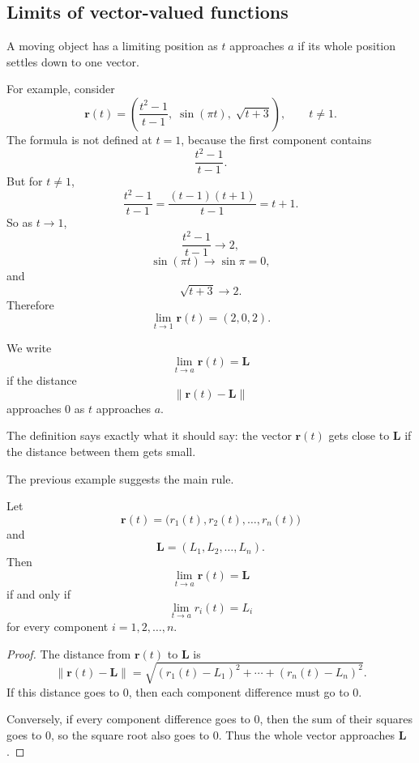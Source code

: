 \subsection{Limits of vector-valued functions}

A moving object has a limiting position as \(t\) approaches \(a\) if its whole position
settles down to one vector.

For example, consider
\[
    \mathbf r(t)=
    \left(
        \frac{t^2-1}{t-1},\;
        \sin(\pi t),\;
        \sqrt{t+3}
    \right),
    \qquad t\ne 1.
\]
The formula is not defined at \(t=1\), because the first component contains
\[
    \frac{t^2-1}{t-1}.
\]
But for \(t\ne1\),
\[
    \frac{t^2-1}{t-1}
    =
    \frac{(t-1)(t+1)}{t-1}
    =
    t+1.
\]
So as \(t\to1\),
\[
    \frac{t^2-1}{t-1}\to2,
\]
\[
    \sin(\pi t)\to \sin\pi=0,
\]
and
\[
    \sqrt{t+3}\to2.
\]
Therefore
\[
    \lim_{t\to1}\mathbf r(t)=(2,0,2).
\]

\begin{definition}
We write
\[
    \lim_{t\to a}\mathbf r(t)=\mathbf L
\]
if the distance
\[
    \|\mathbf r(t)-\mathbf L\|
\]
approaches \(0\) as \(t\) approaches \(a\).
\end{definition}

The definition says exactly what it should say: the vector \(\mathbf r(t)\) gets close to
\(\mathbf L\) if the distance between them gets small.

The previous example suggests the main rule.

\begin{theorem}
Let
\[
    \mathbf r(t)=\bigl(r_1(t),r_2(t),\ldots,r_n(t)\bigr)
\]
and
\[
    \mathbf L=(L_1,L_2,\ldots,L_n).
\]
Then
\[
    \lim_{t\to a}\mathbf r(t)=\mathbf L
\]
if and only if
\[
    \lim_{t\to a}r_i(t)=L_i
\]
for every component \(i=1,2,\ldots,n\).
\end{theorem}

\begin{proof}
The distance from \(\mathbf r(t)\) to \(\mathbf L\) is
\[
    \|\mathbf r(t)-\mathbf L\|
    =
    \sqrt{
    (r_1(t)-L_1)^2+\cdots+(r_n(t)-L_n)^2
    }.
\]
If this distance goes to \(0\), then each component difference must go to \(0\).

Conversely, if every component difference goes to \(0\), then the sum of their squares
goes to \(0\), so the square root also goes to \(0\).  Thus the whole vector approaches
\(\mathbf L\).
\end{proof}

